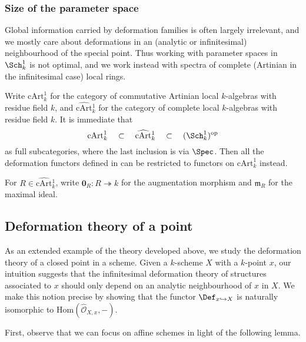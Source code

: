 \subsubsection{Size of the parameter space} 
Global information carried by deformation families is often largely irrelevant,
and we mostly care about deformations in an (analytic or infinitesimal)
neighbourhood of the special point. Thus working with parameter spaces in
\(\Sch^1_k\) is not optimal, and we work instead with spectra of complete
(Artinian in the infinitesimal case) local rings.

Write \(\text{cArt}^1_k\) for the category of commutative Artinian local
\(k\)-algebras with residue field \(k\), and \(\widehat{\text{cArt}}{}^1_k\) for
the category of complete local \(k\)-algebras with residue field \(k\). It is
immediate that 
\[\text{cArt}^1_k \quad \subset \quad \widehat{\text{cArt}}{}^1_k \quad \subset
\quad (\Sch^1_k)^\text{op}\]
as full subcategories, where the last inclusion is via \(\Spec\). Then all the
deformation functors defined in  can
be restricted to functors on \(\text{cArt}^1_k\) instead.

For \(R\in \widehat{\text{cArt}}{}^1_k\), write \(\mathbold{0}_R:
R\twoheadrightarrow k\) for the augmentation morphism and \(\mathfrak{m}_R\) for
the maximal ideal.

\subsection{ Deformation theory of a point}
\label{subsec-defthy-of-a-point}
As an extended example of the theory developed above, we study the deformation
theory of a closed point in a scheme. Given a \(k\)-scheme \(X\) with a
\(k\)-point \(x\), our intuition suggests that the infinitesimal deformation
theory of structures associated to \(x\) should only depend on an analytic
neighbourhood of \(x\) in \(X\). We make this notion precise by showing that the
functor \(\Def_{x\hookrightarrow X}\) is naturally isomorphic to
\(\text{Hom}(\widehat{\mathscr{O}}_{X,x}, -)\). 

First, observe that we can focus on affine schemes in light of the following
lemma.

